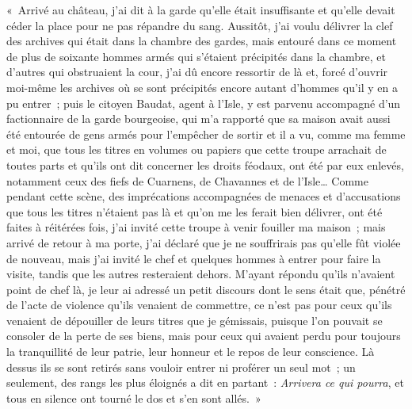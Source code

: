 \documentclass[french,twoside]{book} %
\newenvironment{quoteblock}%
  {\begin{quoting}}
  {\end{quoting}}
\newenvironment{quotebar}{%
    \def\FrameCommand{{\color{rubric!10!}\vrule width 0.5em} \hspace{0.9em}}%
    \def\OuterFrameSep{\itemsep} %
    \MakeFramed {\advance\hsize-\width \FrameRestore}
  }%
  {%
    \endMakeFramed
  }
\renewenvironment{quoteblock}%
  {%
    \savenotes
    \setstretch{0.9}
    \normalfont
    \begin{quotebar}
  }
  {%
    \end{quotebar}
    \spewnotes
  }
\begin{document}
\begin{quoteblock}
 \noindent « Arrivé au château, j’ai dit à la garde qu’elle était insuffisante et qu’elle devait céder la place pour ne pas répandre du sang. Aussitôt, j’ai voulu délivrer la clef des archives qui était dans la chambre des gardes, mais entouré dans ce moment de plus de soixante hommes armés qui s’étaient précipités dans la chambre, et d’autres qui obstruaient la cour, j’ai dû encore ressortir de là et, forcé d’ouvrir moi-même les archives où se sont précipités encore autant d’hommes qu’il y en a pu entrer ; puis le citoyen Baudat, agent à l’Isle, y est parvenu accompagné d’un factionnaire de la garde bourgeoise, qui m’a rapporté que sa maison avait aussi été entourée de gens armés pour l’empêcher de sortir et il a vu, comme ma femme et moi, que tous les titres en volumes ou papiers que cette troupe arrachait de toutes parts et qu’ils ont dit concerner les droits féodaux, ont été par eux enlevés, notamment ceux des fiefs de Cuarnens, de Chavannes et de l’Isle… Comme pendant cette scène, des imprécations accompagnées de menaces et d’accusations que tous les titres n’étaient pas là et qu’on me les ferait bien délivrer, ont été faites à réitérées fois, j’ai invité cette troupe à venir fouiller ma maison ; mais arrivé de retour à ma porte, j’ai déclaré que je ne souffrirais pas qu’elle fût violée de nouveau, mais j’ai invité le chef et quelques hommes à entrer pour faire la visite, tandis que les autres resteraient dehors. M’ayant répondu qu’ils n’avaient point de chef là, je leur ai adressé un petit discours dont le sens était que, pénétré de l’acte de violence qu’ils venaient de commettre, ce n’est pas pour ceux qu’ils venaient de dépouiller de leurs titres que je gémissais, puisque l’on pouvait se consoler de la perte de ses biens, mais pour ceux qui avaient perdu pour toujours la tranquillité de leur patrie, leur honneur et le repos de leur conscience. Là dessus ils se sont retirés sans vouloir entrer ni proférer un seul mot ; un seulement, des rangs les plus éloignés a dit en partant : \emph{Arrivera ce qui pourra}, et tous en silence ont tourné le dos et s’en sont allés. »
 \end{quoteblock}
\end{document}
